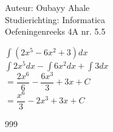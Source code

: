 \documentclass[a4paper]{article}
\newcommand{\dint}{\displaystyle\int}
\begin{document}
  
\noindent \large Auteur: Oubayy Ahale          \\
\noindent \large Studierichting: Informatica   \\
\noindent \large Oefeningenreeks 4A nr. 5.5   \\

\medskip

\normalsize

$\dint (2x^5 - 6x^2 + 3) dx$\\

$\dint 2x^5 dx -  \dint 6x^2 dx + \dint 3 dx$\\

$= \dfrac{2x^6}{6} - \dfrac{6x^3}{3} + 3x + C$\\

$= \dfrac{x^6}{3} - 2x^3 + 3x + C$\\

\begin{thebibliography}{999}
\end{thebibliography}
\end{document}
